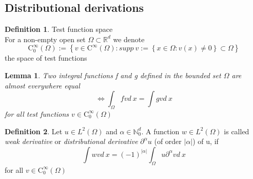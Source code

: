 \documentclass[english]{article}
\newtheorem*{lemma}{Lemma}
\theoremstyle{definition}
\newtheorem*{defi}{Definition}
\theoremstyle{remark}
\newcommand{\p}{\partial}
\newcommand{\NN}{\mathbb{N}}			%
\newcommand{\RR}{\mathbb{R}}			%
\renewcommand{\aa}{\alpha}		%
\newcommand{\OO}{\Omega}
\newcommand{\cinf}{\tx{C}^\infty}
\newcommand{\gdw}{\Leftrightarrow}	%
\newcommand{\tx}[1]{\text{#1}}
\begin{document}
\subsection{Distributional derivations}
\begin{defi} Test function space\\
  For a non-empty open set $\OO \subset \RR^d$ we denote 
  $$\cinf_0 (\OO) := \left\{v \in \cinf(\OO) : supp\ v := \left\{x \in \OO: v(x)\neq 0 \right\} \subset \OO\right\}$$
  the space of test functions
\end{defi}
\begin{lemma}
  Two integral functions f and g defined in the bounded set $\OO$ are almost everywhere equal 
  $$\gdw \int_\OO f v d\ x = \int g v d\ x$$
  for all test functions $v \in \cinf_0(\OO	)$
\end{lemma}
\begin{defi}
  Let $u \in L^2(\OO)$ and $\aa \in \NN^d _0$. A function $w \in L^2(\OO)$ is called \emph{weak derivative} or \emph{distributional derivative} $\p^\aa u$ (of order $|\aa|$) of u, if 
  $$\int w v d\ x = (-1)^{|\aa|} \int _\OO u \p^\aa v d\ x$$
  for all $v \in \cinf_0(\OO)$

\end{defi}
\end{document}
